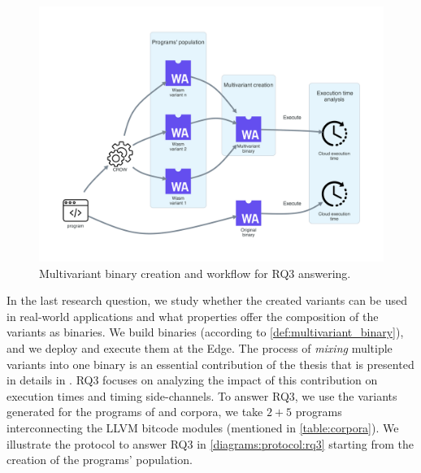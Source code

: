 
\section{\rqthree}
\label{rq3:method}




\newcommand{\mewe}{MEWE\xspace}

\begin{figure}[h]
    \centering
    \includegraphics[width=0.8\linewidth]{diagrams/Rq3.pdf}
    \caption{Multivariant binary creation and workflow for RQ3 answering.}
    \label{diagrams:protocol:rq3}
\end{figure}


In the last research question, we study whether the created variants can be used in real-world applications and what properties offer the composition of the variants as binaries. We build binaries (according to \autoref{def:multivariant_binary}), and we deploy and execute them at the Edge. The process of \emph{mixing} multiple variants into one binary is an essential contribution of the thesis that is presented in details in \cite{2021arXiv210808125C}. RQ3 focuses on analyzing the impact of this contribution on execution times and timing side-channels. To answer RQ3, we use the variants generated for the programs of \corpussodium and \corpusqrcode corpora, we take $2 + 5$ programs interconnecting the LLVM bitcode modules (mentioned in \autoref{table:corpora}). We illustrate the protocol to answer RQ3 in \autoref{diagrams:protocol:rq3} starting from the creation of the programs' population.



